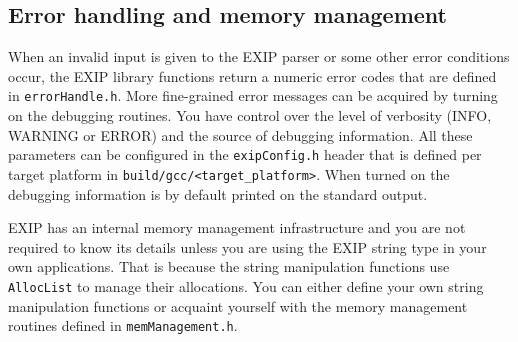 \subsection{Error handling and memory management}
\label{sec:errors-memory}
When an invalid input is given to the EXIP parser or some other error conditions occur, the
EXIP library functions return a numeric error codes that are defined in \texttt{errorHandle.h}.
More fine-grained error messages can be acquired by turning on the debugging routines.
You have control over the level of verbosity (INFO, WARNING or ERROR) and the source of
debugging information. All these parameters can be configured in the \texttt{exipConfig.h} header
that is defined per target platform in \texttt{build/gcc/<target\_platform>}.
When turned on the debugging information is by default printed on the standard output.

EXIP has an internal memory management infrastructure and you are not required to
know its details unless you are using the EXIP string type in your own applications. That is because
the string manipulation functions use \texttt{AllocList} to manage their allocations.
You can either define your own string manipulation functions or acquaint yourself with 
the memory management routines defined in \texttt{memManagement.h}.
